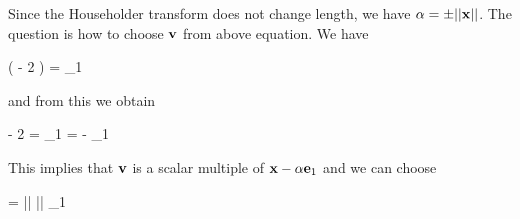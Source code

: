 Since the Householder transform does not change length, we have $\alpha = \pm || \mathbf{x}||$. The question is how to choose $\mathbf{v}$ from above equation. We have

\bee
\left( \Ibf - 2  \right) \xbf = \alpha \ebf_1
\eee

and from this we obtain

\bee
\xbf - 2  \xbf = \alpha \ebf_1   \vbf = \xbf - \alpha \ebf_1
\eee

This implies that $\mathbf{v}$ is a scalar multiple of $\mathbf{x} - \alpha \mathbf{e}_1$ and we can choose

\bee
\vbf = \xbf \pm || \xbf || \ebf_1
\eee



